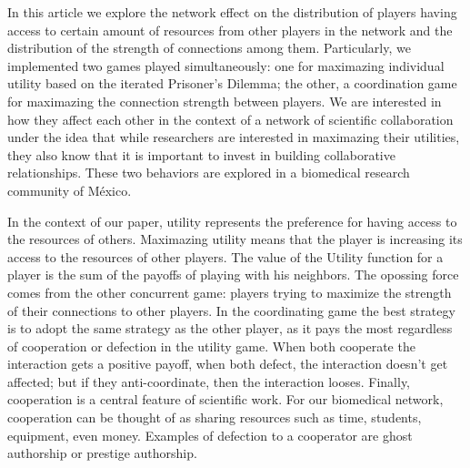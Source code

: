 \documentclass[11pt]{article}
\begin{document}

 {\color{red}In this article we explore the network effect on the distribution
   of players having access to certain amount of resources from other players in the
   network and the distribution of the strength of connections among
   them. Particularly, we implemented two games played simultaneously: 
   one for maximazing individual utility based on the iterated Prisoner's
   Dilemma; the other, a coordination game for maximazing the connection strength between
   players. We are interested in how they affect each other in 
   the context of a network of scientific collaboration under the idea that while
   researchers are interested in maximazing their utilities, they also know that
   it is important to invest in building collaborative relationships. These two
   behaviors are explored in a biomedical research community of M\'exico.}\\    

{\color{red}In the context of our paper, utility represents
  the preference for having access to the resources of others. Maximazing
  utility means that the player is increasing its access to the resources of
  other players. The value of the Utility function for a player is the sum of the payoffs of playing
  with his neighbors. The opossing force comes from the other concurrent game: players
  trying to maximize the strength of their connections to other players. In the coordinating game
  the best strategy is to adopt the same strategy as the other player, as it pays the most
  regardless of cooperation or defection in the utility game. When
  both cooperate the interaction gets a positive payoff, when both defect, the
  interaction doesn't get affected; but if they anti-coordinate, then the
  interaction looses. Finally, cooperation is a central feature of scientific work.
  For our biomedical network, cooperation can be thought of
  as sharing resources such as time, students, equipment, even money. Examples of defection
  to a cooperator are ghost authorship or
  prestige authorship.


}\\
\end{document}
